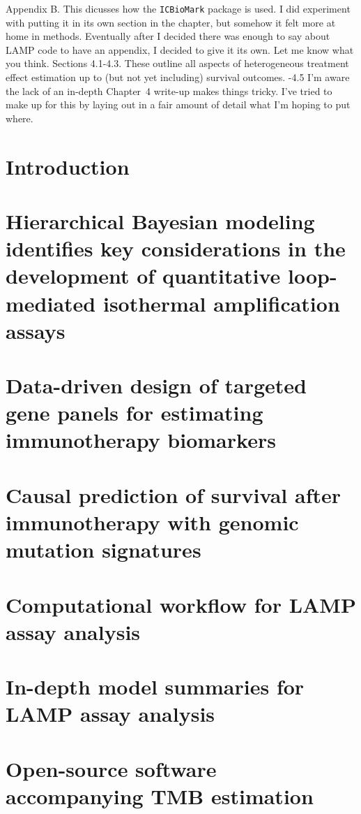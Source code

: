 \documentclass[12pt,twoside,openright]{report}
\theoremstyle{definition}
\begin{document}
{\begin{outline}
    \1 Appendix B. This dicusses how the \texttt{ICBioMark} package is used. I did experiment with putting it in its own section in the chapter, but somehow it felt more at home in methods. Eventually after I decided there was enough to say about LAMP code to have an appendix, I decided to give it its own. Let me know what you think.
    \1 Sections 4.1-4.3. These outline all aspects of heterogeneous treatment effect estimation up to (but not yet including) survival outcomes.
    -4.5 I'm aware the lack of an in-depth Chapter~4 write-up makes things tricky. I've tried to make up for this by laying out in a fair amount of detail what I'm hoping to put where.
\end{outline}
}

\chapter{Introduction \label{chap:intro}}




\chapter{Hierarchical Bayesian modeling identifies key considerations in the
development of quantitative loop-mediated isothermal amplification
assays \label{chap:lamp_modelling}}



\chapter{Data-driven design of targeted gene panels for estimating immunotherapy biomarkers \label{chap:tmb_estimation}}



\chapter{Causal prediction of survival after immunotherapy with genomic mutation signatures \label{chap:causal_genomics}}






\appendix

\chapter{Computational workflow for LAMP assay analysis}


\chapter{In-depth model summaries for LAMP assay analysis}


\chapter{Open-source software accompanying TMB estimation}

\end{document}
